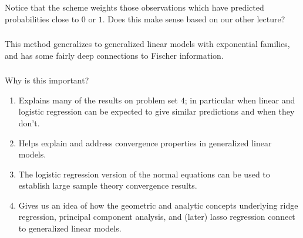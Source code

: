 \begin{frame}[fragile] \frametitle{}

Notice that the scheme weights those observations which
have predicted probabilities close to $0$ or $1$. \pause
Does this make sense based on our other lecture?

\end{frame}

\begin{frame}[fragile] \frametitle{}

This method generalizes to generalized linear models with
exponential families, and has some fairly deep connections to
Fischer information.

\end{frame}


\begin{frame}[fragile] \frametitle{}

Why is this important? \pause
\begin{enumerate}
\item Explains many of the results on problem set $4$; in
particular when linear and logistic regression can be expected
to give similar predictions and when they don't. \pause
\item Helps explain and address convergence properties in
generalized linear models. \pause
\item The logistic regression version of the normal equations
can be used to establish large sample theory convergence results. \pause
\item Gives us an idea of how the geometric and analytic concepts underlying
ridge regression, principal component analysis, and (later) lasso regression
connect to generalized linear models.
\end{enumerate}

\end{frame}













